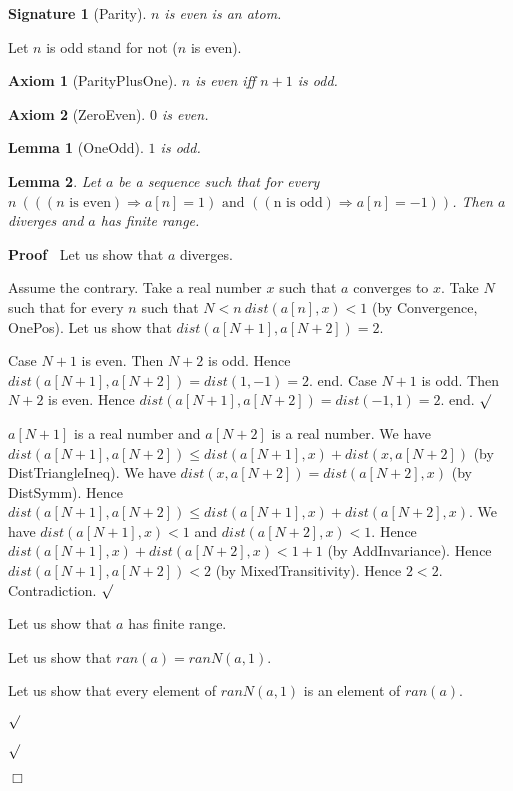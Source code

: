 \documentclass{article}
\newenvironment{forthel}{\begin{leftbar}}{\end{leftbar}}
\newenvironment{proof}{\noindent\textbf{Proof\ }}{\hspace*{\fill}$\Box$\medskip}
\newenvironment{subproof}{\begin{list}{}{}
		\item[\text{Proof}]}{\hfill $\surd$ \end{list}}
\newtheorem{axiom}{Axiom}
\newtheorem{lemma}{Lemma}
\newtheorem{signature}{Signature}
\begin{document}
\begin{forthel}
	\begin{signature}[Parity]
	$n$ is even is an atom.
	\end{signature}
	
	\noindent Let $n$ is odd stand for not ($n$ is even).
	
	\begin{axiom}[ParityPlusOne]
	$n$ is even iff $n + 1$ is odd.
	\end{axiom}

	\begin{axiom}[ZeroEven]
	$0$ is even.
	\end{axiom}
	
	\begin{lemma}[OneOdd]
	$1$ is odd.
	\end{lemma} 
	
	\begin{lemma}
	Let $a$ be a sequence such that for every $n \ (((n \text{ is even}) \Rightarrow a[n] = 1) \text{ and } ((\text{n is odd}) \Rightarrow a[n] = -1))$.
	Then $a$ diverges and $a$ has finite range.
	\end{lemma}
	\begin{proof}
	Let us show that $a$ diverges.
	\begin{subproof}
	Assume the contrary.
	Take a real number $x$ such that $a$ converges to $x$.
	Take $N$ such that for every $n$ such that $N < n \ dist(a[n],x) < 1$ (by Convergence, OnePos).
	Let us show that $dist(a[N + 1],a[N + 2]) = 2$.
	\begin{subproof}
	Case $N + 1$ is even.
	Then $N + 2$ is odd.
	Hence $dist(a[N + 1],a[N + 2]) = dist(1,-1) = 2$.
	end.
	Case $N + 1$ is odd.
	Then $N + 2$ is even.
	Hence $dist(a[N + 1],a[N + 2]) = dist(-1,1) = 2$.
	end.
	\end{subproof}
	$a[N + 1]$ is a real number and $a[N + 2]$ is a real number.
	We have $dist(a[N + 1],a[N + 2]) \leq dist(a[N + 1],x) + dist(x,a[N + 2])$ (by DistTriangleIneq).
	We have $dist(x,a[N + 2]) = dist(a[N + 2],x)$ (by DistSymm).
	Hence $dist(a[N + 1],a[N + 2]) \leq dist(a[N + 1],x) + dist(a[N + 2],x)$.
	We have $dist(a[N + 1],x) < 1$ and $dist(a[N + 2],x) < 1$.
	Hence $dist(a[N + 1],x) + dist(a[N + 2],x) < 1 + 1$ (by AddInvariance).
	Hence $dist(a[N + 1],a[N + 2]) < 2$ (by MixedTransitivity).
	Hence $2 < 2$.
	Contradiction.
	\end{subproof}
	Let us show that $a$ has finite range.
	\begin{subproof}
	Let us show that $ran(a) = ranN(a,1)$.
	\begin{subproof}
	Let us show that every element of $ranN(a,1)$ is an element of $ran(a)$.

\end{subproof}
\end{subproof}
\end{proof}
\end{forthel}
\end{document}
